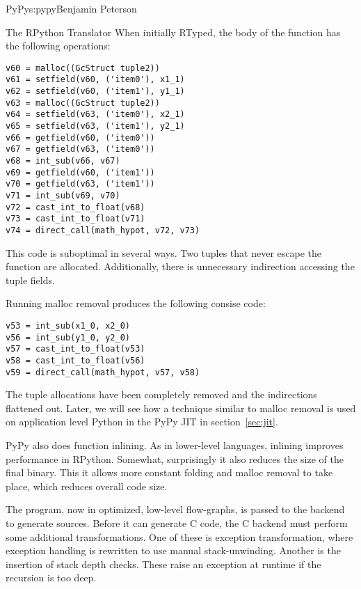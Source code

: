\begin{aosachapter}{PyPy}{s:pypy}{Benjamin Peterson}
\begin{aosasect1}{The RPython Translator}
When initially RTyped, the body of the function has the following operations:
\begin{verbatim}
v60 = malloc((GcStruct tuple2))
v61 = setfield(v60, ('item0'), x1_1)
v62 = setfield(v60, ('item1'), y1_1)
v63 = malloc((GcStruct tuple2))
v64 = setfield(v63, ('item0'), x2_1)
v65 = setfield(v63, ('item1'), y2_1)
v66 = getfield(v60, ('item0'))
v67 = getfield(v63, ('item0'))
v68 = int_sub(v66, v67)
v69 = getfield(v60, ('item1'))
v70 = getfield(v63, ('item1'))
v71 = int_sub(v69, v70)
v72 = cast_int_to_float(v68)
v73 = cast_int_to_float(v71)
v74 = direct_call(math_hypot, v72, v73)
\end{verbatim}
This code is suboptimal in several ways. Two tuples that never escape the
function are allocated. Additionally, there is unnecessary indirection accessing
the tuple fields.

Running malloc removal produces the following consise code:
\begin{verbatim}
v53 = int_sub(x1_0, x2_0)
v56 = int_sub(y1_0, y2_0)
v57 = cast_int_to_float(v53)
v58 = cast_int_to_float(v56)
v59 = direct_call(math_hypot, v57, v58)
\end{verbatim}
The tuple allocations have been completely removed and the indirections
flattened out. Later, we will see how a technique similar to malloc removal is
used on application level Python in the PyPy JIT in section~\ref{sec:jit}.

PyPy also does function inlining. As in lower-level languages, inlining improves
performance in RPython. Somewhat, surprisingly it also reduces the size of the
final binary. This it allows more constant folding and malloc removal to take
place, which reduces overall code size.

The program, now in optimized, low-level flow-graphs, is passed to the backend
to generate sources. Before it can generate C code, the C backend must perform
some additional transformations. One of these is exception transformation, where
exception handling is rewritten to use manual stack-unwinding. Another is the
insertion of stack depth checks. These raise an exception at runtime if the
recursion is too deep.


\end{aosasect1}
\end{aosachapter}
